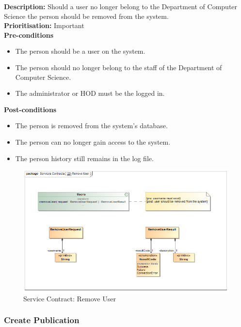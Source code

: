 \documentclass[a4paper]{article}
\begin{document}
        \textbf{Description:} Should a user no longer belong to the Department of Computer Science the person should be removed from the system.\\
        \textbf{Prioritisation:} Important\\
        
        \textbf{Pre-conditions}
         \begin{itemize}
            \item The person should be a user on the system.
            \item The person should no longer belong to the staff of the Department of Computer Science.
            \item The administrator or HOD must be the logged in.
       \end{itemize}
        
        \textbf{Post-conditions}
        \begin{itemize}
            \item The person is removed from the system's database.
            \item The person can no longer gain access to the system.
            \item The person history still remains in the log file.
        \end{itemize}

        	\begin{figure}[H]
        		\centering
        		\includegraphics[width=\textwidth]{../Assignment1/5.1.4.Remove.User.Services.Contract.png}
        		\caption{Service Contract: Remove User}
        	\end{figure}
        \pagebreak
    \subsubsection{Create Publication}
        
\end{document}
